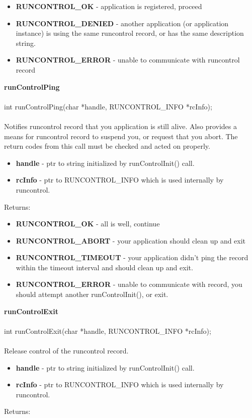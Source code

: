 \documentclass[11pt]{article}
\begin{document}
\begin{itemize}
  \item {\bf RUNCONTROL\_OK} - application is registered, proceed
  \item {\bf RUNCONTROL\_DENIED} - another application (or application instance) is using the same runcontrol record, or has the same description string.
  \item {\bf RUNCONTROL\_ERROR} - unable to communicate with runcontrol record
\end{itemize}
{\bf runControlPing}\\
\\
int runControlPing(char *handle, RUNCONTROL\_INFO *rcInfo);\\
\\
Notifies runcontrol record that you application is still alive. Also provides a means for runcontrol record to suspend you, or request that you abort. The return codes from this call must be checked and acted on properly.

\begin{itemize}
  \item {\bf handle} - ptr to string initialized by runControlInit() call.
  \item {\bf rcInfo} - ptr to RUNCONTROL\_INFO which is used internally by runcontrol.
\end{itemize}
Returns:

\begin{itemize}
  \item {\bf RUNCONTROL\_OK} - all is well, continue
  \item {\bf RUNCONTROL\_ABORT} - your application should clean up and exit
  \item {\bf RUNCONTROL\_TIMEOUT} - your application didn't ping the record within the timeout interval and should clean up and exit.
  \item {\bf RUNCONTROL\_ERROR} - unable to communicate with record, you should attempt another runControlInit(), or exit.
\end{itemize}
{\bf runControlExit}\\
\\
int runControlExit(char *handle, RUNCONTROL\_INFO *rcInfo);\\
\\
Release control of the runcontrol record.

\begin{itemize}
  \item {\bf handle} - ptr to string initialized by runControlInit() call.
  \item {\bf rcInfo} - ptr to RUNCONTROL\_INFO which is used internally by runcontrol.
\end{itemize}
Returns:
\end{document}
